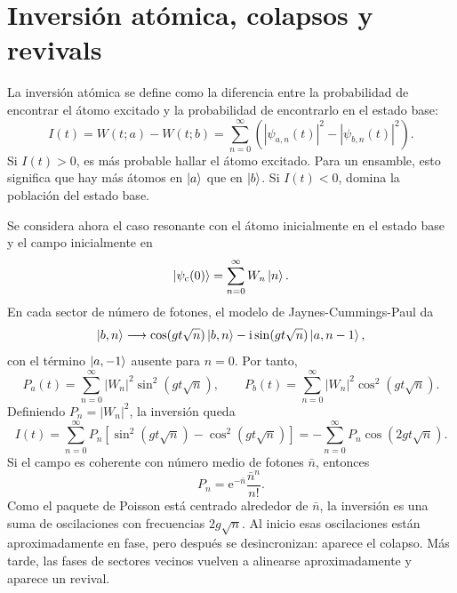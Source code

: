 \documentclass[11pt]{article}
\newcommand{\ii}{\mathrm{i}}
\newcommand{\ee}{\mathrm{e}}
\begin{document}
\section{Inversi\'on at\'omica, colapsos y revivals}

La inversi\'on at\'omica se define como la diferencia entre la probabilidad de
encontrar el \'atomo excitado y la probabilidad de encontrarlo en el estado
base:
\begin{equation}
  \boxed{
  I(t)
  =
  W(t;a)-W(t;b)
  =
  \sum_{n=0}^{\infty}
  \left(
  |\psi_{a,n}(t)|^2
  -
  |\psi_{b,n}(t)|^2
  \right).
  }
\end{equation}
Si $I(t)>0$, es m\'as probable hallar el \'atomo excitado. Para un ensamble,
esto significa que hay m\'as \'atomos en $\ket{a}$ que en $\ket{b}$. Si
$I(t)<0$, domina la poblaci\'on del estado base.

Se considera ahora el caso resonante con el \'atomo inicialmente en el estado
base y el campo inicialmente en
\begin{equation}
  \ket{\psi_{\mathrm{c}}(0)}
  =
  \sum_{n=0}^{\infty}W_n\ket{n}.
\end{equation}
En cada sector de n\'umero de fotones, el modelo de Jaynes-Cummings-Paul da
\begin{equation}
  \ket{b,n}
  \longrightarrow
  \cos(gt\sqrt{n})\ket{b,n}
  -
  \ii\sin(gt\sqrt{n})\ket{a,n-1},
\end{equation}
con el t\'ermino $\ket{a,-1}$ ausente para $n=0$. Por tanto,
\begin{equation}
  P_a(t)
  =
  \sum_{n=0}^{\infty}|W_n|^2\sin^2(gt\sqrt{n}),
  \qquad
  P_b(t)
  =
  \sum_{n=0}^{\infty}|W_n|^2\cos^2(gt\sqrt{n}).
\end{equation}
Definiendo $P_n=|W_n|^2$, la inversi\'on queda
\begin{equation}
  \boxed{
  I(t)
  =
  \sum_{n=0}^{\infty}P_n
  \left[
  \sin^2(gt\sqrt{n})
  -
  \cos^2(gt\sqrt{n})
  \right]
  =
  -\sum_{n=0}^{\infty}P_n\cos(2gt\sqrt{n}) .
  }
\end{equation}
Si el campo es coherente con n\'umero medio de fotones $\bar n$, entonces
\begin{equation}
  P_n=\ee^{-\bar n}\frac{\bar n^n}{n!}.
\end{equation}
Como el paquete de Poisson est\'a centrado alrededor de $\bar n$, la
inversi\'on es una suma de oscilaciones con frecuencias $2g\sqrt{n}$. Al inicio
esas oscilaciones est\'an aproximadamente en fase, pero despu\'es se
desincronizan: aparece el colapso. M\'as tarde, las fases de sectores vecinos
vuelven a alinearse aproximadamente y aparece un revival.
\end{document}
